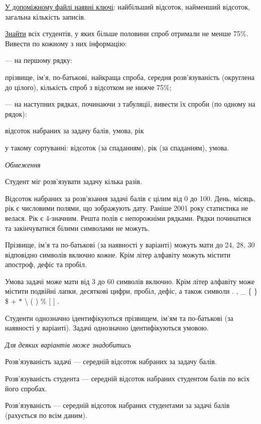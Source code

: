 \documentclass[11pt, ukrainian]{article}
\begin{document}
\underline{У допоміжному файлі наявні ключі}: найбільший відсоток, найменший відсоток, загальна кількість записів.

\underline{Знайти} всіх студентів, у яких більше половини спроб отримали не менше 75\%. Вивести по кожному з них інформацію:\par
{\noindent}--- на першому рядку:\par
прізвище, ім’я, по-батькові, найкраща спроба, середня розв’язуваність (округлена до цілого), кількість спроб з відсотком не нижче 75\%;

{\noindent}--- на наступних рядках, починаючи з табуляції, вивести їх спроби (по одному на рядок):\par
відсоток набраних за задачу балів, умова, рік

{\noindent}у такому сортуванні: відсоток (за спаданням), рік (за спаданням), умова.


\bigskip\textit{Обмеження}

Студент міг розв’язувати задачу кілька разів.

Відсоток набраних за розв’язання задачі балів є цілим від 0 до 100.
День, місяць, рік є числовими полями, що зображують дату.
Раніше 2001 року статистика не велася. Рік є 4-значним.
Решта полів є непорожніми рядками.
Рядки починатися та закінчуватися білими символами не можуть.

Прізвище, ім’я та по-батькові (за наявності у варіанті) можуть мати до 24, 28, 30 відповідно символів включно кожне. 
Крім літер алфавіту можуть містити апостроф, дефіс та пробіл.

Умова задачі може мати від 3 до 60 символів включно.
Крім літер алфавіту може містити подвійні лапки, десяткові цифри, пробіл, дефіс,
а також символи . , \_ \{ \} \$ $+$ $*$ {\textbackslash} ( ) \% $[$ $]$ .

Студенти однозначно ідентифікуються прізвищем, ім’ям та по-батькові (за наявності у варіанті).
Задачі однозначно ідентифікуються умовою.

\bigskip\textit{Для деяких варіантів може знадобитись}

Розв'язуваність задачі --- середній відсоток набраних за задачу балів.

Розв'язуваність студента --- середній відсоток набраних студентом балів по всіх його спробах.

Розв'язуваність --- середній відсоток набраних студентами за задачі балів (рахується по всім даним).
\end{document}
